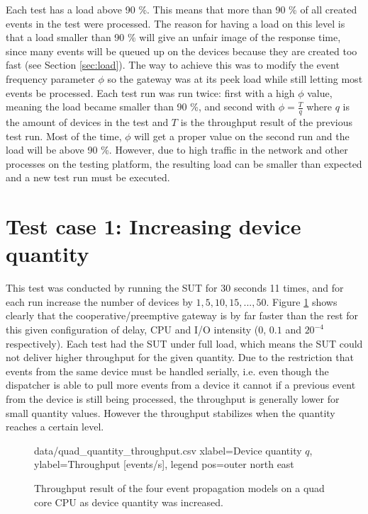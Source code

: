 Each test has a load above 90 \%. This means that more than 90 \% of all
created events in the test were processed. The reason for having a load on this
level is that a load smaller than 90 \% will give an unfair image of the
response time, since many events will be queued up on the devices because they
are created too fast (see Section \ref{sec:load}). The way to achieve this was
to modify the event frequency parameter $\phi$ so the gateway was at its peek
load while still letting most events be processed. Each test run was run twice:
first with a high $\phi$ value, meaning the load became smaller than 90 \%, and
second with $\phi = \frac{T}{q}$ where $q$ is the amount of devices in the test
and $T$ is the throughput result of the previous test run. Most of the time,
$\phi$ will get a proper value on the second run and the load will be above 90
\%. However, due to high traffic in the network and other processes on the
testing platform, the resulting load can be smaller than expected and a new
test run must be executed.

\section{Test case 1: Increasing device quantity}

This test was conducted by running the SUT for 30 seconds 11 times, and for
each run increase the number of devices by $1, 5, 10, 15, ..., 50$. Figure
\ref{fig:quad_quantity_throughput} shows clearly that the
cooperative/preemptive gateway is by far faster than the rest for this given
configuration of delay, CPU and I/O intensity (0, $0.1$ and $20^{-4}$
respectively). Each test had the SUT under full load, which means the SUT could
not deliver higher throughput for the given quantity. Due to the restriction
that events from the same device must be handled serially, i.e. even though the
dispatcher is able to pull more events from a device it cannot if a previous
event from the device is still being processed, the throughput is generally
lower for small quantity values. However the throughput stabilizes when the
quantity reaches a certain level.

\begin{figure}[h!]
    \centering
    \performanceplot
    {data/quad_quantity_throughput.csv}
    {
        xlabel=Device quantity $q$,
        ylabel={Throughput [events/s]},
        legend pos=outer north east
    }

    \caption[Throughput result when device quantity was increased.]{Throughput
    result of the four event propagation models on a quad core CPU as device
    quantity was increased.}

    \label{fig:quad_quantity_throughput}
\end{figure}

